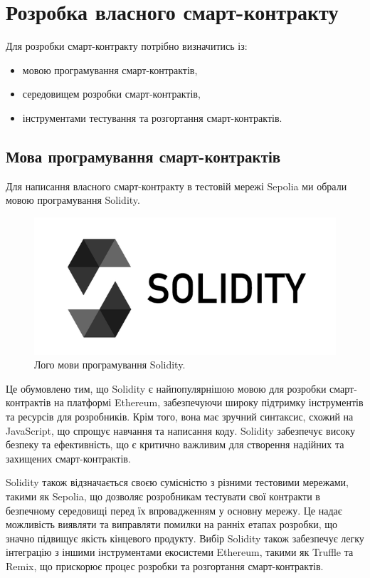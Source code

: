 \chapter{Розробка власного смарт-контракту}
\label{chap:theory}

Для розробки смарт-контракту потрібно визначитись із:
\begin{itemize}
    \item мовою програмування смарт-контрактів,
    \item середовищем розробки смарт-контрактів,
    \item інструментами тестування та розгортання смарт-контрактів.
\end{itemize}

\section{Мова програмування смарт-контрактів}

Для написання власного смарт-контракту в тестовій мережі Sepolia ми обрали мовою програмування Solidity. 

    \begin{figure}[ht]
        \centering
        \includegraphics[scale=0.5]{IMAGES/solidity-logo.png}
        \caption{Лого мови програмування Solidity.}
        \label{fig_sudak}
    \end{figure}

Це обумовлено тим, що Solidity є найпопулярнішою мовою для розробки смарт-контрактів на платформі Ethereum, забезпечуючи широку підтримку інструментів та ресурсів для розробників. Крім того, вона має зручний синтаксис, схожий на JavaScript, що спрощує навчання та написання коду. Solidity забезпечує високу безпеку та ефективність, що є критично важливим для створення надійних та захищених смарт-контрактів.

Solidity також відзначається своєю сумісністю з різними тестовими мережами, такими як Sepolia, що дозволяє розробникам тестувати свої контракти в безпечному середовищі перед їх впровадженням у основну мережу. Це надає можливість виявляти та виправляти помилки на ранніх етапах розробки, що значно підвищує якість кінцевого продукту. Вибір Solidity також забезпечує легку інтеграцію з іншими інструментами екосистеми Ethereum, такими як Truffle та Remix, що прискорює процес розробки та розгортання смарт-контрактів.

